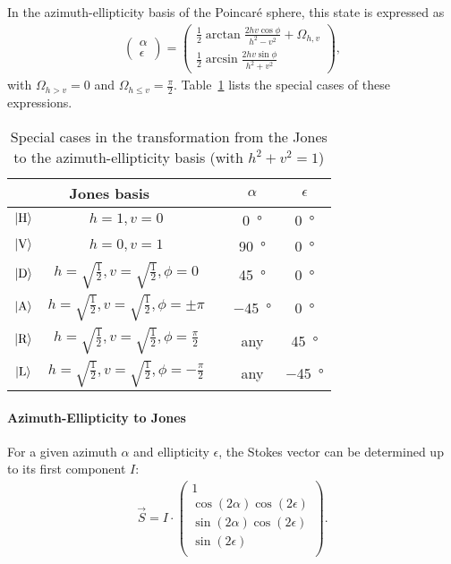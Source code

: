 In the azimuth-ellipticity basis of the Poincaré sphere, this state is expressed as
\begin{align}
    \begin{pmatrix}\alpha \\ \epsilon \end{pmatrix} =
    \begin{pmatrix}
        \frac{1}{2} \arctan \frac{2hv \cos \phi}{h^2 - v^2} + \Omega_{h, v}\\
        \frac{1}{2} \arcsin \frac{2hv\sin\phi}{h^2 + v^2}
    \end{pmatrix}
    ,
\end{align}
with $\Omega_{h > v} = 0$ and $\Omega_{h \leq v} = \frac{\pi}{2}$. Table~\ref{tab:jones_to_ae_special_cases} lists the special cases of these expressions.
\begin{table}
    \centering
    \begin{tabular}{ccccc}
        \toprule
        \multicolumn{2}{c}{Jones basis} && $\alpha$ & $\epsilon$ \\
        \toprule
        $\Ket{\text{H}}$ & $h = 1, v = 0$ && \SI[]{0}{\degree} & \SI[]{0}{\degree} \\
        $\Ket{\text{V}}$ & $h = 0, v = 1$ && \SI[]{+90}{\degree} & \SI[]{0}{\degree} \\
        $\Ket{\text{D}}$ & $h = \sqrt{\frac{1}{2}}, v = \sqrt{\frac{1}{2}}, \phi = 0$ && \SI[]{+45}{\degree} & \SI[]{0}{\degree} \\
        $\Ket{\text{A}}$ & $h = \sqrt{\frac{1}{2}}, v = \sqrt{\frac{1}{2}}, \phi = \pm\pi$ && \SI[]{-45}{\degree} & \SI[]{0}{\degree} \\
        $\Ket{\text{R}}$ & $h = \sqrt{\frac{1}{2}}, v = \sqrt{\frac{1}{2}}, \phi = \frac{\pi}{2}$ && any & \SI[]{+45}{\degree} \\
        $\Ket{\text{L}}$ & $h = \sqrt{\frac{1}{2}}, v = \sqrt{\frac{1}{2}}, \phi = -\frac{\pi}{2}$ && any & \SI[]{-45}{\degree} \\
        \bottomrule
    \end{tabular}
    \caption{Special cases in the transformation from the Jones to the azimuth-ellipticity basis (with $h^2 + v^2 = 1$)}   
    \label{tab:jones_to_ae_special_cases}
\end{table}

\paragraph*{Azimuth-Ellipticity to Jones}
For a given azimuth $\alpha$ and ellipticity $\epsilon$, the Stokes vector can be determined up to its first component $I$:
\begin{align}
    \vec S = I \cdot 
    \begin{pmatrix}
        1 \\
        \cos (2\alpha) \cos(2\epsilon) \\
        \sin (2\alpha) \cos(2\epsilon) \\
        \sin(2\epsilon) \\
    \end{pmatrix}.
\end{align}

